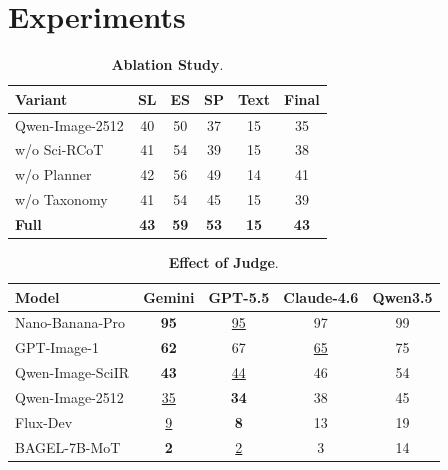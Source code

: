 \documentclass[runningheads]{llncs}
\begin{document}
\section{Experiments}
\begin{table}[t]
\centering
\caption{\textbf{Ablation Study}.}
\label{tab:ablation_study}

\small
\setlength{\tabcolsep}{5pt}
\renewcommand{\arraystretch}{1.15}

\begin{tabular}{lccccc}
\toprule
\textbf{Variant} & \textbf{SL} & \textbf{ES} & \textbf{SP} & \textbf{Text} & \textbf{Final} \\
\midrule
Qwen-Image-2512 & 40 & 50 & 37 & 15 & 35 \\
w/o Sci-RCoT    & 41 & 54 & 39 & 15 & 38 \\
w/o Planner     & 42 & 56 & 49 & 14 & 41 \\
w/o Taxonomy    & 41 & 54 & 45 & 15 & 39 \\
\textbf{Full}
& \cellcolor{skyblue!35}\textbf{43}
& \cellcolor{skyblue!35}\textbf{59}
& \cellcolor{skyblue!35}\textbf{53}
& \cellcolor{skyblue!35}\textbf{15}
& \cellcolor{skyblue!35}\textbf{43}
\\
\bottomrule
\end{tabular}
\end{table}

\begin{table}[t]
\centering
\caption{\textbf{Effect of Judge}.}
\label{tab:judge_sensitivity}

\small
\setlength{\tabcolsep}{4pt}
\renewcommand{\arraystretch}{1.15}

\begin{tabular}{lcccc}
\toprule
\textbf{Model}
&
\textbf{Gemini}
&
\textbf{GPT-5.5}
&
\textbf{Claude-4.6}
&
\textbf{Qwen3.5}
\\
\midrule
Nano-Banana-Pro
& \cellcolor{skyblue!35}\textbf{95}
& \underline{95}
& 97
& 99 \\

GPT-Image-1
& \cellcolor{skyblue!35}\textbf{62}
& 67
& \underline{65}
& 75 \\

Qwen-Image-SciIR
& \cellcolor{skyblue!35}\textbf{43}
& \underline{44}
& 46
& 54 \\

Qwen-Image-2512
& \underline{35}
& \cellcolor{skyblue!35}\textbf{34}
& 38
& 45 \\

Flux-Dev
& \underline{9}
& \cellcolor{skyblue!35}\textbf{8}
& 13
& 19 \\

BAGEL-7B-MoT
& \cellcolor{skyblue!35}\textbf{2}
& \underline{2}
& 3
& 14 \\
\bottomrule
\end{tabular}
\end{table}
\end{document}
